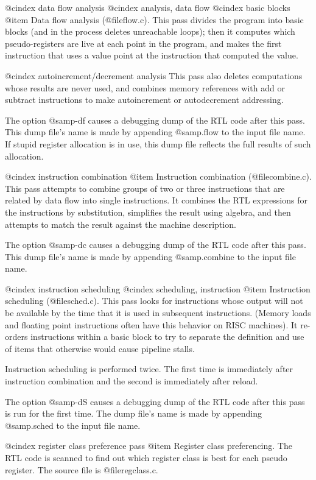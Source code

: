 @cindex data flow analysis
@cindex analysis, data flow
@cindex basic blocks
@item
Data flow analysis (@file{flow.c}).  This pass divides the program
into basic blocks (and in the process deletes unreachable loops); then
it computes which pseudo-registers are live at each point in the
program, and makes the first instruction that uses a value point at
the instruction that computed the value.

@cindex autoincrement/decrement analysis
This pass also deletes computations whose results are never used, and
combines memory references with add or subtract instructions to make
autoincrement or autodecrement addressing.

The option @samp{-df} causes a debugging dump of the RTL code after
this pass.  This dump file's name is made by appending @samp{.flow} to
the input file name.  If stupid register allocation is in use, this
dump file reflects the full results of such allocation.

@cindex instruction combination
@item
Instruction combination (@file{combine.c}).  This pass attempts to
combine groups of two or three instructions that are related by data
flow into single instructions.  It combines the RTL expressions for
the instructions by substitution, simplifies the result using algebra,
and then attempts to match the result against the machine description.

The option @samp{-dc} causes a debugging dump of the RTL code after
this pass.  This dump file's name is made by appending @samp{.combine}
to the input file name.

@cindex instruction scheduling
@cindex scheduling, instruction
@item
Instruction scheduling (@file{sched.c}).  This pass looks for
instructions whose output will not be available by the time that it is
used in subsequent instructions.  (Memory loads and floating point
instructions often have this behavior on RISC machines).  It re-orders
instructions within a basic block to try to separate the definition and
use of items that otherwise would cause pipeline stalls.

Instruction scheduling is performed twice.  The first time is immediately
after instruction combination and the second is immediately after reload.

The option @samp{-dS} causes a debugging dump of the RTL code after this
pass is run for the first time.  The dump file's name is made by
appending @samp{.sched} to the input file name.

@cindex register class preference pass
@item
Register class preferencing.  The RTL code is scanned to find out
which register class is best for each pseudo register.  The source
file is @file{regclass.c}.

